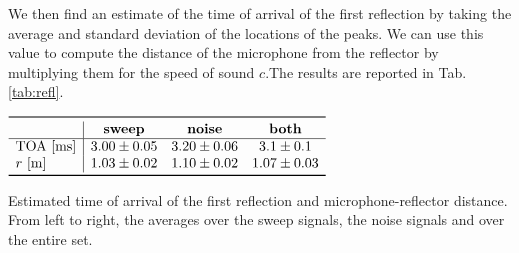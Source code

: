\documentclass[a4paper]{article}
\begin{document}
We then find an estimate of the time of arrival of the first reflection by taking the average and standard deviation of the locations of the peaks.  We can use this value to compute the distance of the microphone from the reflector by multiplying them for the speed of sound $c$.The results are reported in Tab. \ref{tab:refl}.
\begin{table}[h!]
	\centering
	$\begin{array}{l|ccc}
		\toprule
		 & \text{\textbf{sweep}} & \text{\textbf{noise}} & \text{\textbf{both}}\\
		 \hline
		 \text{TOA [ms]} & 3.00 \pm 0.05 & 3.20 \pm 0.06 & 3.1 \pm  0.1 \\
		 r\text{ [m]} & 1.03 \pm 0.02 & 1.10 \pm 0.02 & 1.07 \pm 0.03\\
		 \bottomrule
	\end{array}$
	\caption{Estimated time of arrival of the first reflection and microphone-reflector distance. From left to right, the averages over the sweep signals, the noise signals and over the entire set.}
	\label{tab:refl}
\end{table}
\end{document}
